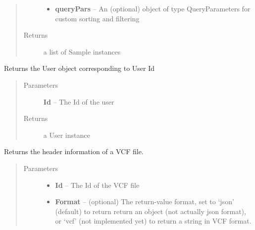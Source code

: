 \documentclass[letterpaper,10pt,english]{sphinxmanual}
\begin{document}
\begin{fulllineitems}
\begin{fulllineitems}
\begin{quote}
\begin{description}
\begin{itemize}
\item {} 
\textbf{queryPars} -- An (optional) object of type QueryParameters for custom sorting and filtering

\end{itemize}

\item[{Returns}] \leavevmode
a list of Sample instances

\end{description}\end{quote}

\end{fulllineitems}


\begin{fulllineitems}
\label{Available modules:BaseSpacePy.api.BaseSpaceAPI.BaseSpaceAPI.getUserById}
Returns the User object corresponding to User Id
\begin{quote}\begin{description}
\item[{Parameters}] \leavevmode
\textbf{Id} -- The Id of the user

\item[{Returns}] \leavevmode
a User instance

\end{description}\end{quote}

\end{fulllineitems}


\begin{fulllineitems}
\label{Available modules:BaseSpacePy.api.BaseSpaceAPI.BaseSpaceAPI.getVariantMetadata}
Returns the header information of a VCF file.
\begin{quote}\begin{description}
\item[{Parameters}] \leavevmode\begin{itemize}
\item {} 
\textbf{Id} -- The Id of the VCF file

\item {} 
\textbf{Format} -- (optional) The return-value format, set to `json' (default) to return return an object (not actually json format), or `vcf' (not implemented yet) to return a string in VCF format.


\end{itemize}
\end{description}
\end{quote}
\end{fulllineitems}
\end{fulllineitems}
\end{document}
